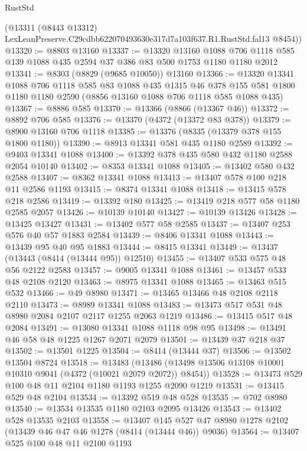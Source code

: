 \begin{lexlean}{RustStd}
\begin{coremodule}
      (@13311
        (@8443 @13312)
        LexLeanPreserve.C29cdbb622070493630e317d7a103f637.R1.RustStd.fal13
        @8454))
@13320 := @8803 @13160
@13337 := @13320
    @13160
    @1088
    @706
    @1118
    @585
    @139
    @1088
    @435
    @2594
    @37
    @386
    @83
    @500
    @1753
    @1180
    @1180
    @2012
@13341 := @8303 (@8829 (@9685 @10050)) @13160
@13366 := @13320
    @13341
    @1088
    @706
    @1118
    @585
    @83
    @1088
    @435
    @1315
    @46
    @378
    @155
    @581
    @1800
    @1180
    @1180
    @2590
    (@8856 @13160 @1088 @706 @1118 @585 @1088 @435)
@13367 := @8886 @585
@13370 := @13366 (@8866 (@13367 @46))
@13372 := @8892 @706 @585
@13376 := @13370 (@4372 (@13372 @83 @378))
@13379 := @8900 @13160 @706 @1118
@13385 := @13376 (@8335 (@13379 @378 @155 @1800 @1180))
@13390 := @8913 @13341 @581 @435 @1180 @2589
@13392 := @9403 @13341 @1088
@13400 := @13392 @378 @435 @580 @432 @1180 @2588 @2054 @10140
@13402 := @8353 @13341 @1088
@13405 := @13402 @580 @432 @2588
@13407 := @8362 @13341 @1088
@13413 := @13407 @578 @100 @218 @11 @2586 @1193
@13415 := @8374 @13341 @1088
@13418 := @13415 @578 @218 @2586
@13419 := @13392 @180
@13425 := @13419 @218 @577 @58 @1180 @2585 @2057
@13426 := @10139 @10140
@13427 := @10139 @13426
@13428 := @13425 @13427
@13431 := @13402 @577 @58 @2585
@13437 := @13407 @253 @576 @40 @57 @1883 @2584
@13439 := @8406 @13341 @1088
@13443 := @13439 @95 @40 @95 @1883
@13444 := @8415 @13341
@13449 := @13437 (@13443 (@8414 (@13444 @95)) @12510)
@13455 := @13407 @533 @575 @48 @56 @2122 @2583
@13457 := @9005 @13341 @1088
@13461 := @13457 @533 @48 @2108 @2120
@13463 := @8975 @13341 @1088
@13465 := @13463 @515 @532
@13466 := @49 @8980
@13471 := @13465 @13466 @48 @2108 @2118 @2110
@13473 := @8989 @13341 @1088
@13483 := @13473 @517 @531 @48 @8980 @2084 @2107 @2117 @1255 @2063 @1219
@13486 := @13415 @517 @48 @2084
@13491 := @13080 @13341 @1088 @1118 @98 @95
@13498 := @13491 @46 @58 @48 @1225 @1267 @2071 @2079
@13501 := @13439 @37 @218 @37
@13502 := @13501 @1225
@13504 := @8414 (@13444 @37)
@13506 := @13502 @13504 @8724
@13518 := @13483
    (@13486 (@13498 @13506 @13108 @10001 @10310 @9041 (@4372 (@10021 @2079 @2072)) @8454))
@13528 := @13473 @529 @100 @48 @11 @2104 @1180 @1193 @1255 @2090 @1219
@13531 := @13415 @529 @48 @2104
@13534 := @13392 @519 @48 @528
@13535 := @702 @8980
@13540 := @13534 @13535 @1180 @2103 @2095 @13426
@13543 := @13402 @528 @13535 @2103
@13558 := @13407
    @145
    @527
    @47
    @8980
    @1278
    @2102
    (@13439 @46 @47 @46 @1278 (@8414 (@13444 @46)) @9036)
@13564 := @13407 @525 @100 @48 @11 @2100 @1193

\end{coremodule}
\end{lexlean}
